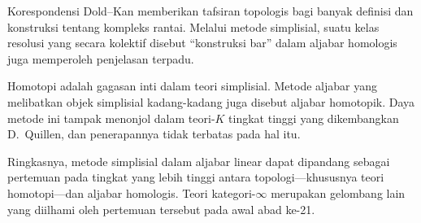 Korespondensi Dold--Kan memberikan tafsiran topologis bagi banyak definisi
dan konstruksi tentang kompleks rantai. Melalui metode simplisial,
suatu kelas resolusi yang secara kolektif disebut ``konstruksi bar'' dalam
aljabar homologis juga memperoleh penjelasan terpadu.

Homotopi adalah gagasan inti dalam teori simplisial. Metode aljabar yang
melibatkan objek simplisial kadang-kadang juga disebut aljabar homotopik.
Daya metode ini tampak menonjol dalam teori-$K$ tingkat tinggi yang
dikembangkan D.\ Quillen, dan penerapannya tidak terbatas pada hal itu.

Ringkasnya, metode simplisial dalam aljabar linear dapat dipandang sebagai
pertemuan pada tingkat yang lebih tinggi antara topologi---khususnya
teori homotopi---dan aljabar homologis. Teori kategori-$\infty$ merupakan
gelombang lain yang diilhami oleh pertemuan tersebut pada awal abad ke-21.
